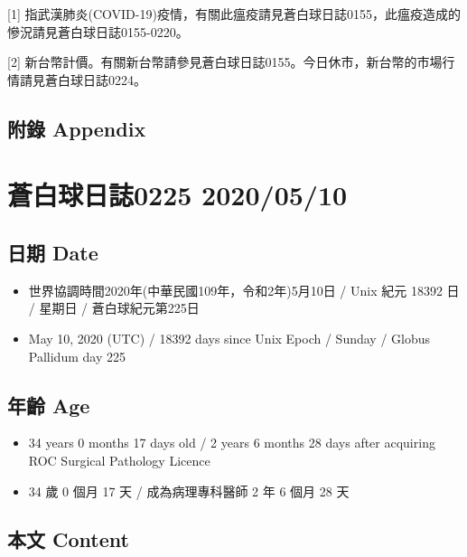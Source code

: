 \documentclass[a5paper, 12pt
]{book}
\providecommand{\tightlist}{%
  \setlength{\itemsep}{0pt}\setlength{\parskip}{0pt}}
\begin{document}
{[}1{]}
指武漢肺炎(COVID-19)疫情，有關此瘟疫請見蒼白球日誌0155，此瘟疫造成的慘況請見蒼白球日誌0155-0220。

{[}2{]}
新台幣計價。有關新台幣請參見蒼白球日誌0155。今日休市，新台幣的市場行情請見蒼白球日誌0224。

\hypertarget{ux9644ux9304-appendix-69}{%
\subsection{附錄 Appendix}\label{ux9644ux9304-appendix-69}}

\hypertarget{ux84bcux767dux7403ux65e5ux8a8c0225-20200510}{%
\section{蒼白球日誌0225
2020/05/10}\label{ux84bcux767dux7403ux65e5ux8a8c0225-20200510}}

\hypertarget{ux65e5ux671f-date-70}{%
\subsection{日期 Date}\label{ux65e5ux671f-date-70}}

\begin{itemize}
\tightlist
\item
  世界協調時間2020年(中華民國109年，令和2年)5月10日 / Unix 紀元 18392 日
  / 星期日 / 蒼白球紀元第225日
\item
  May 10, 2020 (UTC) / 18392 days since Unix Epoch / Sunday / Globus
  Pallidum day 225
\end{itemize}

\hypertarget{ux5e74ux9f61-age-70}{%
\subsection{年齡 Age}\label{ux5e74ux9f61-age-70}}

\begin{itemize}
\tightlist
\item
  34 years 0 months 17 days old / 2 years 6 months 28 days after
  acquiring ROC Surgical Pathology Licence
\item
  34 歲 0 個月 17 天 / 成為病理專科醫師 2 年 6 個月 28 天
\end{itemize}

\hypertarget{ux672cux6587-content-70}{%
\subsection{本文 Content}\label{ux672cux6587-content-70}}
\end{document}
